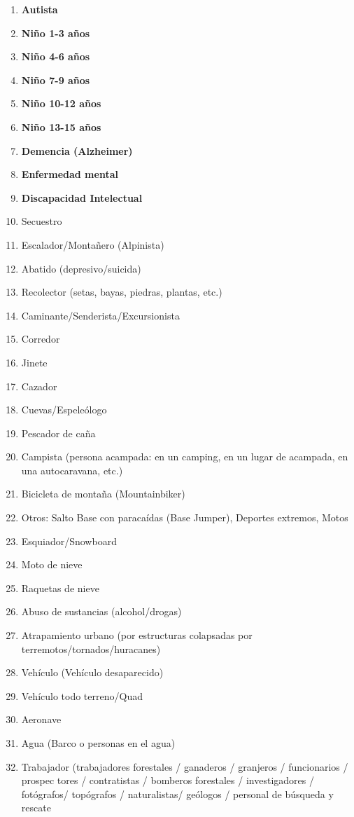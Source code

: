 \begin{enumerate}
    \item \textbf{Autista}
    \item \textbf{Niño 1-3 años}
    \item \textbf{Niño 4-6 años}
    \item \textbf{Niño 7-9 años}
    \item \textbf{Niño 10-12 años}
    \item \textbf{Niño 13-15 años}
    \item \textbf{Demencia (Alzheimer)}
    \item \textbf{Enfermedad mental}
    \item \textbf{Discapacidad Intelectual}
    \item Secuestro 
    \item Escalador/Montañero (Alpinista)
    \item Abatido (depresivo/suicida) 
    \item Recolector (setas, bayas, piedras, plantas, etc.)
    \item Caminante/Senderista/Excursionista
    \item Corredor
    \item Jinete 
    \item Cazador 
    \item Cuevas/Espeleólogo
    \item Pescador de caña
    \item Campista (persona acampada: en un camping, en un lugar de acampada, en una autocaravana, etc.)
    \item Bicicleta de montaña (Mountainbiker) 
    \item Otros: Salto Base con paracaídas (Base Jumper), Deportes extremos, Motos
    \item Esquiador/Snowboard
    \item Moto de nieve 
    \item Raquetas de nieve 
    \item Abuso de sustancias (alcohol/drogas) 
    \item Atrapamiento urbano (por estructuras colapsadas por terremotos/tornados/huracanes) 
    \item Vehículo (Vehículo desaparecido) 
    \item Vehículo todo terreno/Quad
    \item Aeronave
    \item Agua (Barco o personas en el agua)
    \item Trabajador (trabajadores forestales / ganaderos / granjeros / funcionarios / prospec tores / contratistas / bomberos forestales / investigadores / fotógrafos/ topógrafos / naturalistas/ geólogos / personal de búsqueda y rescate
\end{enumerate}


